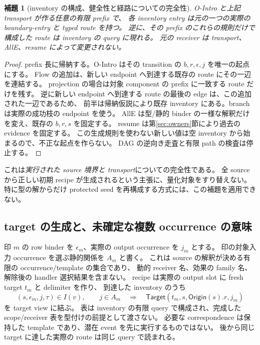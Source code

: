 \documentclass[11pt,a4paper]{article}
\newtheorem{lemma}[definition]{補題}
\begin{document}
\begin{lemma}[inventory の構成、健全性と経路についての完全性]
\label{lem:inventory}
O-Intro と上記 transport が作る任意の有限 prefix で、
各 inventory entry は元の一つの実際の boundary-entry と typed route を持つ。
逆に、その prefix のこれらの規則だけで構成した route は inventory の query に現れる。
元の receiver は transport、AllE、resume によって変更されない。
\end{lemma}
\begin{proof}
prefix 長に帰納する。O-Intro はその transition の \(b,r,\epsilon,j\) を唯一の起点にする。
Flow の追加は、新しい endpoint へ到達する既存の route にその一辺を連結する。
projection の場合は対象 component の prefix に一致する route だけを残す。
逆に新しい endpoint へ到達する route の最後の edge は、この追加された一辺であるため、
前半は帰納仮説により既存 inventory にある。branch は実際の成功枝の endpoint を使う。
AllE は型/静的 binder の一様な解釈だけを変え、既存の \(b,r,s\) を固定する。
resume は第\ref{sec:owners}節により過去の evidence を固定する。
この生成規則を使わない新しい値は空 inventory から始まるので、不正な起点を作らない。
DAG の逆向き走査と有限 path の検査は停止する。
\end{proof}

これは\emph{実行された source 境界と transport}についての完全性である。
全 source から正しい初期 recipe が生成されるという主張に、量化対象をすり替えない。
特に型の解からだけ protected seed を再構成する方式には、この補題を適用できない。

\subsection{target の生成と、未確定な複数 occurrence の意味}

印 \(m\) の row binder を \(\epsilon_m\)、実際の output occurrence を \(j_m\) とする。
印の対象入力 occurrence を選ぶ静的関係を \(A_m\) と書く。
これは source の解釈が決める有限の occurrence/template の集合であり、
動的 receiver 名、効果の family 名、解除後の handler 選択結果を含まない。
recipe は実際の output slot に fresh target \(t_m\) と delimiter を作り、
到達した inventory のうち
\[
 (s,\epsilon_m,j,\tau)\in I(v),\qquad j\in A_m
 \quad\Longrightarrow\quad
 \mathsf{Target}(t_m,s,\mathsf{Origin}(s).r,j_m)
 \tag{O-Target}
\]
を target view に結ぶ。
表は inventory の有限 query で構成され、完成した scope/receiver 表を型付けの前提として渡さない。
必要な correspondence は保持した template であり、潜在 event を先に実行するものではない。
後から同じ target に達した実際の route は同じ query で読まれる。
\end{document}
